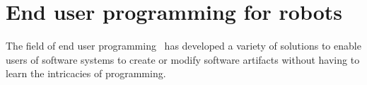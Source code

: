 \documentclass[10pt,twocolumn]{article}
\begin{document}
% 



\section{End user programming for robots}

The field of end user programming~\cite{lieberman-yourwish,dontcheva-nocode} has developed a variety of solutions to enable users of software systems to create or modify software artifacts without having to learn the intricacies of programming.  
\end{document}
